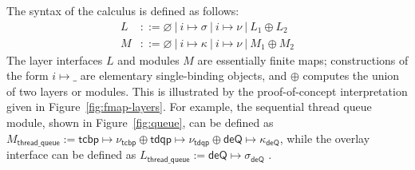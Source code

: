 The syntax of the calculus is defined as follows:
\begin{align*}
    L &::= \varnothing
            \ |\ i \mapsto \sigma
            \ |\ i \mapsto \nu
            \ |\ L_1 \oplus L_2 \\
    M &::= \varnothing
            \ |\ i \mapsto \kappa
            \ |\ i \mapsto \nu
            \ |\ M_1 \oplus M_2
\end{align*}
\noindent{}The layer interfaces $L$ and modules $M$
are essentially finite maps;
constructions of the form $i \mapsto \_$
are elementary single-binding objects,
and $\oplus$ computes
the union of two layers or modules.
This is illustrated by the proof-of-concept
interpretation given in 
Figure~\ref{fig:fmap-layers}.
For example, the sequential thread queue module, shown in Figure~\ref{fig:queue},
can be defined as 
$M_\textsf{thread\_queue}:=\textsf{tcbp}\mapsto \nu_\textsf{tcbp} 
\oplus \textsf{tdqp}\mapsto \nu_\textsf{tdqp}
\oplus \textsf{deQ}\mapsto \kappa_\textsf{deQ}$,
while the overlay interface can be defined as 
$L_\textsf{thread\_queue}:= \textsf{deQ}\mapsto \sigma_\textsf{deQ}$ .

